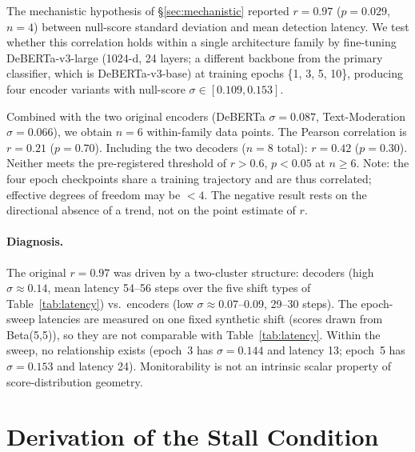 \documentclass{article}
\begin{document}
The mechanistic hypothesis of \S\ref{sec:mechanistic} reported $r = 0.97$ ($p = 0.029$, $n = 4$) between null-score standard deviation and mean detection latency. We test whether this correlation holds within a single architecture family by fine-tuning DeBERTa-v3-large (1024-d, 24 layers; a different backbone from the primary classifier, which is DeBERTa-v3-base) at training epochs \{1, 3, 5, 10\}, producing four encoder variants with null-score $\sigma \in [0.109, 0.153]$.

Combined with the two original encoders (DeBERTa $\sigma = 0.087$, Text-Moderation $\sigma = 0.066$), we obtain $n = 6$ within-family data points. The Pearson correlation is $r = 0.21$ ($p = 0.70$). Including the two decoders ($n = 8$ total): $r = 0.42$ ($p = 0.30$). Neither meets the pre-registered threshold of $r > 0.6$, $p < 0.05$ at $n \geq 6$. Note: the four epoch checkpoints share a training trajectory and are thus correlated; effective degrees of freedom may be $<4$. The negative result rests on the directional absence of a trend, not on the point estimate of $r$.

\paragraph{Diagnosis.} The original $r = 0.97$ was driven by a two-cluster structure: decoders (high $\sigma \approx 0.14$, mean latency 54--56 steps over the five shift types of Table~\ref{tab:latency}) vs.\ encoders (low $\sigma \approx 0.07$--0.09, 29--30 steps). The epoch-sweep latencies are measured on one fixed synthetic shift (scores drawn from Beta(5,5)), so they are not comparable with Table~\ref{tab:latency}. Within the sweep, no relationship exists (epoch~3 has $\sigma = 0.144$ and latency 13; epoch~5 has $\sigma = 0.153$ and latency 24). Monitorability is not an intrinsic scalar property of score-distribution geometry.

\section{Derivation of the Stall Condition}
\label{app:derivation}
\end{document}
